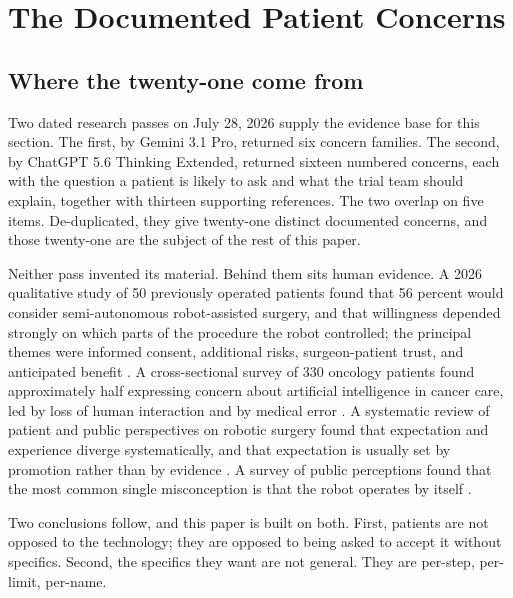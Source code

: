 \section{The Documented Patient Concerns}

\subsection{Where the twenty-one come from}

Two dated research passes on July 28, 2026 supply the evidence base for this
section. The first, by Gemini 3.1 Pro, returned six concern families. The second,
by ChatGPT 5.6 Thinking Extended, returned sixteen numbered concerns, each with
the question a patient is likely to ask and what the trial team should explain,
together with thirteen supporting references. The two overlap on five items.
De-duplicated, they give twenty-one distinct documented concerns, and those
twenty-one are the subject of the rest of this paper.

Neither pass invented its material. Behind them sits human evidence. A 2026
qualitative study of 50 previously operated patients found that 56 percent would
consider semi-autonomous robot-assisted surgery, and that willingness depended
strongly on which parts of the procedure the robot controlled; the principal
themes were informed consent, additional risks, surgeon-patient trust, and
anticipated benefit \cite{WuSemiAI2026}. A cross-sectional survey of 330
oncology patients found approximately half expressing concern about artificial
intelligence in cancer care, led by loss of human interaction and by medical
error \cite{TelesAI2026A}. A systematic review of patient and public
perspectives on robotic surgery found that expectation and experience diverge
systematically, and that expectation is usually set by promotion rather than by
evidence \cite{Jauniaux2025}. A survey of public perceptions found that the most
common single misconception is that the robot operates by itself
\cite{BrarRAS2024X}.

Two conclusions follow, and this paper is built on both. First, patients are not
opposed to the technology; they are opposed to being asked to accept it without
specifics. Second, the specifics they want are not general. They are per-step,
per-limit, per-name.

\vspace{0.30em}

